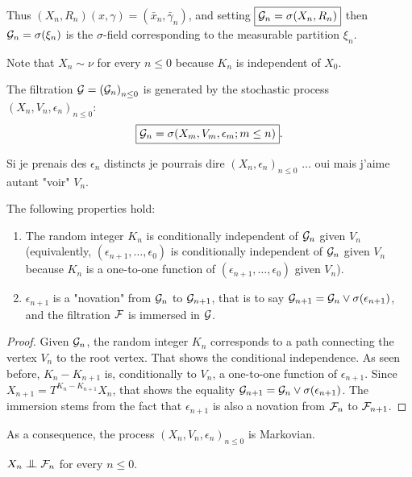 \documentclass[12pt,a4paper]{article}
\begin{document}
Thus $(X_n,R_n)(x,\gamma) = (\bar x_n, \bar\gamma_n)$, 
and setting $\boxed{\mathcal{G}_n = \sigma(X_n, R_n)}$ then 
$\mathcal{G}_n = \sigma(\xi_n)$ is the $\sigma$-field corresponding to 
the measurable partition $\xi_n$. 

Note that $X_n \sim \nu$ for every $n \leq 0$ because $K_n$ is independent of $X_0$.

The filtration $\mathcal{G}={(\mathcal{G}_n)}_{n \leq 0}$ is  generated by the stochastic process 
${(X_n, V_n, \epsilon_n)}_{n \leq 0}$:
$$
\boxed{\mathcal{G}_n = \sigma(X_m, V_m, \epsilon_m; m \leq n)}. 
$$


\begin{remark}
Si je prenais des $\epsilon_n$ distincts je pourrais dire 
${(X_n, \epsilon_n)}_{n \leq 0}$ ... oui mais j'aime autant "voir" $V_n$.
\end{remark}

\begin{lemma}\label{lemma:novation}
The following properties hold:
\begin{enumerate}
\item The random integer $K_n$ is conditionally independent of $\mathcal{G}_n$ 
given $V_n$ (equivalently, $(\epsilon_{n+1}, \ldots, \epsilon_0)$ 
is conditionally independent of $\mathcal{G}_n$ 
given $V_n$ because $K_n$ is a one-to-one function of 
$(\epsilon_{n+1}, \ldots, \epsilon_0)$ given $V_n$).

\item $\epsilon_{n+1}$ is 
a "novation" from $\mathcal{G}_n$ to $\mathcal{G}_{n+1}$, that is 
to say $\mathcal{G}_{n+1} = \mathcal{G}_n \vee \sigma(\epsilon_{n+1})$, and  
the filtration $\mathcal{F}$ is immersed in $\mathcal{G}$.
\end{enumerate}
\end{lemma}

\begin{proof}
Given $\mathcal{G}_n$, the random integer $K_n$ corresponds to a path  
connecting the vertex $V_n$ to the root vertex. 
That shows the conditional independence. 
As seen before, $K_{n}-K_{n+1}$ is, conditionally to $V_n$, 
a one-to-one function of $\epsilon_{n+1}$. Since 
$X_{n+1} = T^{K_{n}-K_{n+1}}X_n$, that shows the equality 
$\mathcal{G}_{n+1} = \mathcal{G}_n \vee \sigma(\epsilon_{n+1})$. 
The immersion stems from the fact that 
 $\epsilon_{n+1}$ is also a novation from $\mathcal{F}_n$ to $\mathcal{F}_{n+1}$.  
\end{proof}

As a consequence, the process ${(X_n, V_n, \epsilon_n)}_{n \leq 0}$ is Markovian. 


\begin{lemma}\label{lemma:independence}
$X_n \indep \FF_n$ for every $n \leq 0$.
\end{lemma}
\end{document}
